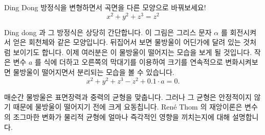 \begin{surferPage}{Ding Dong}
방정식을 변형하면서 곡면을 다른 모양으로 바꿔보세요!\\

\smallskip
\[x^2	+ y^2	+ z^3	= z^2\]

\singlespacing
Ding dong 과 그 방정식은 상당히 간단합니다. 이 그림은 그리스 문자  $\alpha$ 를 회전시켜서 얻은 회천체와 같은 모양입니다. 뒤집어서 보면 물방울이 어딘가에 달려 있는 것처럼 보이기도 합니다. 이제 여러분은 이 물방울이 떨어지는 모습을 보게 될 것입니다. 
\newline
작은 변수 $a$ 를 식에 더하고 오른쪽의 막대기를 이용하여 크기를 연속적으로 변화시켜보면 물방울이 떨어지면서 분리되는 모습을 볼 수 있습니다.  
\[x^2	+ y^2	+ z^3	-z^2+0.1\cdot a=0.\]

매순간 물방울은 표면장력과 중력의 균형을 맞춥니다. 그러나 그 균형은 안정적이지 않기 때문에 물방울이 떨어지기 전에 크게 요동칩니다. Ren\'e Thom 의 재앙이론은 변수의 조그마한 변화가 물리적 균형에 얼마나 즉각적인 영향을 끼치는지에 대해 설명합니다. 
\end{surferPage}
